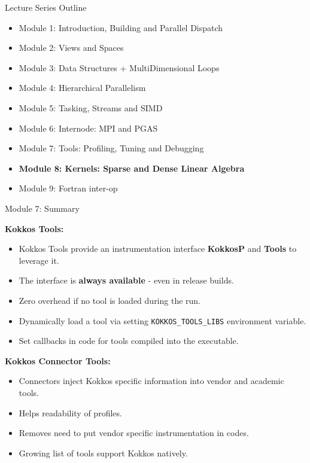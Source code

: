 \begin{frame}[fragile]{Lecture Series Outline}

\begin{itemize}
        \item Module 1: Introduction, Building and Parallel Dispatch
        \item Module 2: Views and Spaces
        \item Module 3: Data Structures + MultiDimensional Loops
        \item Module 4: Hierarchical Parallelism
        \item Module 5: Tasking, Streams and SIMD
        \item Module 6: Internode: MPI and PGAS
        \item Module 7: Tools: Profiling, Tuning and Debugging
        \item \textbf{Module 8: Kernels: Sparse and Dense Linear Algebra}
        \item Module 9: Fortran inter-op
\end{itemize}

\end{frame}

\begin{frame}[fragile]{Module 7: Summary}

\textbf{Kokkos Tools:}
\begin{itemize}
  \item Kokkos Tools provide an instrumentation interface \textbf{KokkosP} and \textbf{Tools} to leverage it.
  \item The interface is \textbf{always available} - even in release builds.
  \item Zero overhead if no tool is loaded during the run.
  \item Dynamically load a tool via setting \texttt{KOKKOS\_TOOLS\_LIBS} environment variable.
  \item Set callbacks in code for tools compiled into the executable. 
\end{itemize}

\textbf{Kokkos Connector Tools:}
\begin{itemize}
  \item Connectors inject Kokkos specific information into vendor and academic tools.
  \item Helps readability of profiles.
  \item Removes need to put vendor specific instrumentation in codes.
  \item Growing list of tools support Kokkos natively.
\end{itemize}
\end{frame}

